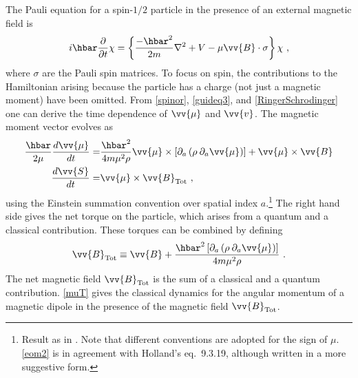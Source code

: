 \documentclass[onecolumn,secnumarabic,balancelastpage,amsmath,amssymb,nofootinbib]{article}
\begin{document}
The Pauli equation for a spin-$1/2$ particle in the presence of an external magnetic field is
\begin{equation}
i\hbar\frac{\partial}{\partial t} \chi = \left\{\frac{-\hbar^2}{2 m}\nabla^2+V-\mu \vv{B} \cdot \sigma\right\}\chi\ ,
\label{RingerSchrodinger}
\end{equation}
where $\sigma$ are the Pauli spin matrices.  To focus on spin, the contributions to the Hamiltonian arising because the particle has a charge (not just a magnetic moment) have been omitted.  From \eqref{spinor}, \eqref{guideq3}, and \eqref{RingerSchrodinger} one can derive the time dependence of $\vv{\mu}$ and $\vv{v}$.  The magnetic moment vector evolves as
\begin{align}
\frac{\hbar}{2 \mu}\frac{d\vv{\mu}}{dt}=&\frac{\hbar^2}{4 m \mu^2 \rho} \vv{\mu} \times \left[ \partial_a \left(\rho \: \partial_a \vv{\mu}\right) \right] + \vv{\mu} \times \vv{B}
\nonumber
\\
\frac{d \vv{S}}{dt}=&\vv{\mu} \times \vv{B}_{\text{Tot}}\ ,
\label{muT}
\end{align}
using the Einstein summation convention over spatial index $a$.\footnote{Result as in \citet[eq.\ 9.3.15]{holland}.  Note that different conventions are adopted for the sign of $\mu$.  \eqref{eom2} is in agreement with Holland's eq.\ 9.3.19, although written in a more suggestive form.}  The right hand side gives the net torque on the particle, which arises from a quantum and a classical contribution.  These torques can be combined by defining
\begin{equation}
\vv{B}_{\text{Tot}}\equiv\vv{B}+\frac{\hbar^2 \left[ \partial_a \left(\rho \: \partial_a \vv{\mu}\right) \right]}{4 m \mu^2 \rho}\ .
\label{bagnetic}
\end{equation}
The net magnetic field $\vv{B}_{\text{Tot}}$ is the sum of a classical and a quantum contribution.  \eqref{muT} gives the classical dynamics for the angular momentum of a magnetic dipole in the presence of the magnetic field $\vv{B}_{\text{Tot}}$.
\end{document}
